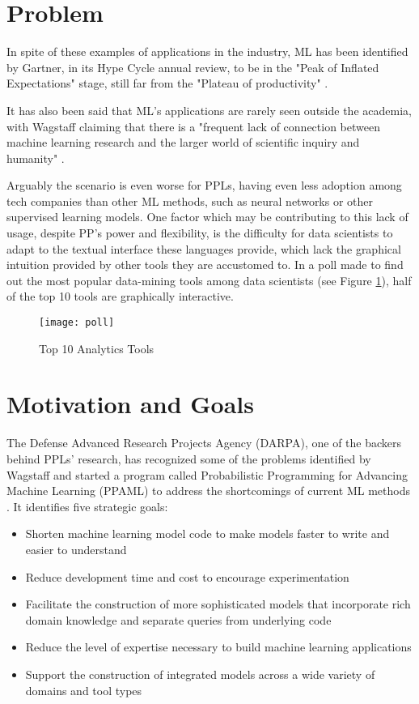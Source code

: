 \section{Problem} \label{sec:proj}

In spite of these examples of applications in the industry, ML has been
identified by Gartner, in its Hype Cycle annual review,
to be in the "Peak of Inflated Expectations" stage, still far
from the "Plateau of productivity" \cite{gartner}.

It has also been said that ML's applications are rarely seen
outside the academia, with Wagstaff claiming that there is a "frequent lack of
connection between machine learning research and the larger world of scientific
inquiry and humanity" \cite{Wagstaff2012}.

Arguably the scenario is even worse for PPLs, having even less adoption
among tech companies than other ML methods, such as neural networks or other
supervised learning models. One factor which may be contributing to this lack of
usage, despite PP's power and flexibility, is the difficulty for data scientists
to adapt to the textual interface these languages provide, which lack the graphical
intuition provided by other tools they are accustomed to. In a poll made to find
out the most popular data-mining tools among data scientists
(see Figure \ref{fig:poll}), half of the top 10 tools are
graphically interactive.

\begin{figure}[!htpb]
  \begin{center}
    \leavevmode
    \texttt{[image: poll]}
    \caption{Top 10 Analytics Tools \cite{kdn}}
    \label{fig:poll}
  \end{center}
\end{figure}

\section{Motivation and Goals} \label{sec:goals}

The Defense Advanced Research Projects Agency (DARPA), one of the backers behind
PPLs' research, has recognized some of the problems
identified by Wagstaff and started a program called Probabilistic Programming
for Advancing Machine Learning (PPAML) to address the shortcomings of
current ML methods \cite{darpa}. It identifies five strategic goals:

\begin{itemize}
  \item Shorten machine learning model code to make models faster to write and
  easier to understand
  \item Reduce development time and cost to encourage experimentation
  \item Facilitate the construction of more sophisticated models that
  incorporate rich domain knowledge and separate queries from underlying code
  \item Reduce the level of expertise necessary to build machine learning
  applications
  \item Support the construction of integrated models across a wide variety of
  domains and tool types
\end{itemize}

